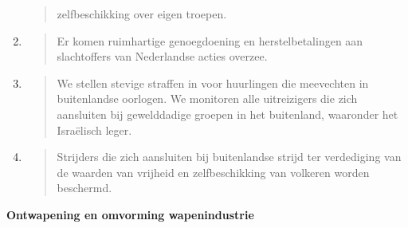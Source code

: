 \begin{enumerate}
\begin{quote}
  zelfbeschikking over eigen troepen.
  \end{quote}
\item
  \begin{quote}
  Er komen ruimhartige genoegdoening en herstelbetalingen aan
  slachtoffers van Nederlandse acties overzee.
  \end{quote}
\item
  \begin{quote}
  We stellen stevige straffen in voor huurlingen die meevechten in
  buitenlandse oorlogen. We monitoren alle uitreizigers die zich
  aansluiten bij gewelddadige groepen in het buitenland, waaronder het
  Israëlisch leger.
  \end{quote}
\item
  \begin{quote}
  Strijders die zich aansluiten bij buitenlandse strijd ter verdediging
  van de waarden van vrijheid en zelfbeschikking van volkeren worden
  beschermd.
  \end{quote}
\end{enumerate}

\textbf{Ontwapening en omvorming wapenindustrie}

